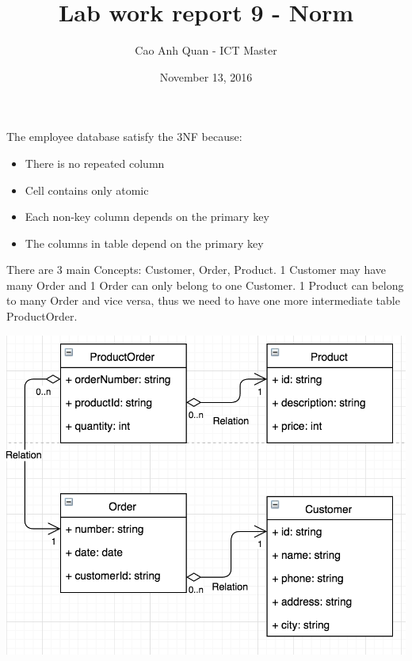 \documentclass[12pt]{article}
\title{Lab work report 9 - Norm}
\author{Cao Anh Quan - ICT Master}
\date{November 13, 2016}
\begin{document}
 
\begin{titlepage}
\maketitle
\end{titlepage}

The employee database satisfy the 3NF because:

\begin{itemize}
\item There is no repeated column
\item Cell contains only atomic
\item Each non-key column depends on the primary key
\item The columns in table depend on the primary key
\end{itemize}

There are 3 main Concepts: Customer, Order, Product. 1 Customer may have many Order and 1 Order can only belong to one Customer. 1 Product can belong to many Order and vice versa, thus we need to have one more intermediate table ProductOrder.

\includegraphics[width=\textwidth]{order.png}

 
\end{document}
